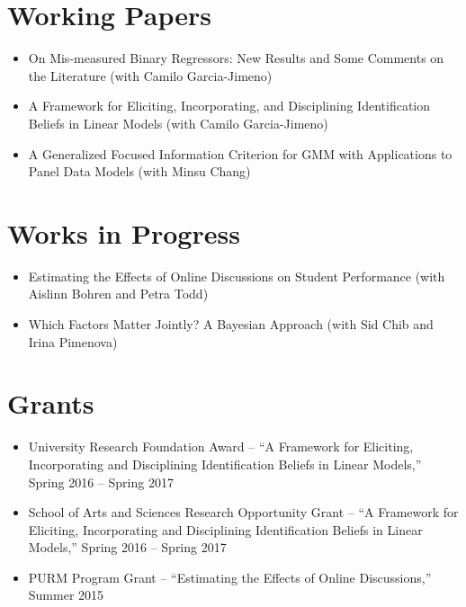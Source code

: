 \documentclass[line,overlapped]{myres}
\begin{document}
\begin{resume}
\section{\sc Working Papers}
\begin{itemize}
  \item On Mis-measured Binary Regressors: New Results and Some Comments on the Literature (with Camilo Garcia-Jimeno)
	\item A Framework for Eliciting, Incorporating, and Disciplining Identification Beliefs in Linear Models (with Camilo Garcia-Jimeno)
	\item A Generalized Focused Information Criterion for GMM with Applications to Panel Data Models (with Minsu Chang)
\end{itemize}




\section{\sc Works in Progress}
\begin{itemize}
  \item Estimating the Effects of Online Discussions on Student Performance (with Aislinn Bohren and Petra Todd)
  \item Which Factors Matter Jointly? A Bayesian Approach (with Sid Chib and Irina Pimenova)
\end{itemize}

\section{\sc Grants}
\begin{itemize}
  \item University Research Foundation Award  -- ``A Framework for Eliciting, Incorporating and Disciplining Identification Beliefs in Linear Models,'' Spring 2016 -- Spring 2017
  \item School of Arts and Sciences Research Opportunity Grant -- ``A Framework for Eliciting, Incorporating and Disciplining Identification Beliefs in Linear Models,'' Spring 2016 -- Spring 2017   
  \item PURM Program Grant -- ``Estimating the Effects of Online Discussions,'' Summer 2015
\end{itemize}





\end{resume}
\end{document}
